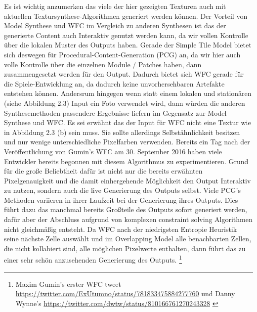\documentclass[12pt, a4paper,twoside,openright]{report} %
\begin{document}
Es ist wichtig anzumerken das viele der hier gezeigten Texturen auch mit aktuellen Textursynthese-Algorithmen generiert werden können.
Der Vorteil von Model Synthese und WFC im Vergleich zu anderen Synthesen ist das der generierte Content auch Interaktiv genutzt werden kann,
da wir vollen Kontrolle über die lokalen Muster des Outputs haben.
Gerade der Simple Tile Model bietet sich deswegen für Procedural-Content-Generation {(PCG)} an, da wir hier auch volle Kontrolle über die einzelnen Module / Patches haben,
dann zusammengesetzt werden für den Output.
Dadurch bietet sich WFC gerade für die Spiele-Entwicklung an, da dadurch keine unvorhersehbaren Artefakte entstehen können.
Andersrum hingegen wenn statt einem lokalen und stationären {(siehe Abbildung 2.3)} Input ein Foto verwendet wird,
dann würden die anderen Synthesemethoden passendere Ergebnisse liefern im Gegensatz zur Model Synthese und WFC.
Es sei erwähnt das der Input für WFC nicht  eine Textur wie in Abbildung 2.3 {(b)} sein muss.
Sie sollte allerdings Selbstähnlichkeit besitzen und nur wenige unterschiedliche Pixelfarben verwenden.
\newline
Bereits ein Tag nach der Veröffentlichung von Gumin's WFC am 30. September 2016 haben viele Entwickler bereits begonnen mit diesem Algorithmus zu experimentieren.
Grund für die große Beliebtheit dafür ist nicht nur die bereits erwähnten Pixelgenauigkeit und die damit einhergehende Möglichkeit den Output Interaktiv zu nutzen,
sondern auch die live Generierung des Outputs selbst.
Viele PCG's Methoden variieren in ihrer Laufzeit bei der Generierung ihres Outputs.
Dies führt dazu das manchmal bereits Großteile des Outputs sofort generiert werden,
dafür aber der Abschluss aufgrund von komplexen constraint solving Algorithmen nicht gleichmäßig entsteht. \cite{Karth2017WaveFunctionCollapseIC}
Da WFC nach der niedrigsten Entropie Heuristik seine nächste Zelle auswählt und im Overlapping Model alle benachbarten Zellen, die nicht kollabiert sind,
alle möglichen Pixelwerte enthalten, dann führt das zu einer sehr schön anzusehenden Generierung des Outputs.
\footnote[4]{Maxim Gumin’s erster WFC tweet 
\newline
\url{https://twitter.com/ExUtumno/status/781833475884277760}
\newline
und Danny Wynne’s 
\newline
\url{https://twitter.com/dwtw/status/810166761270243328} \cite{Karth2017WaveFunctionCollapseIC}}
\end{document}
